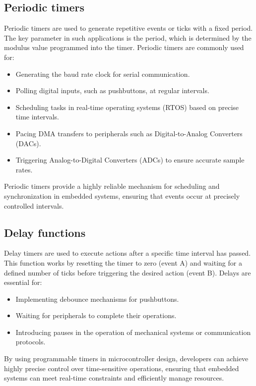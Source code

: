\subsection{Periodic timers}
Periodic timers are used to generate repetitive events or ticks with a fixed period. 
The key parameter in such applications is the period, which is determined by the modulus value programmed into the timer. 
Periodic timers are commonly used for:
\begin{itemize}
    \item Generating the baud rate clock for serial communication.
    \item Polling digital inputs, such as pushbuttons, at regular intervals.
    \item Scheduling tasks in real-time operating systems (RTOS) based on precise time intervals.
    \item Pacing DMA transfers to peripherals such as Digital-to-Analog Converters (DACs).
    \item Triggering Analog-to-Digital Converters (ADCs) to ensure accurate sample rates.
\end{itemize}
Periodic timers provide a highly reliable mechanism for scheduling and synchronization in embedded systems, ensuring that events occur at precisely controlled intervals.

\subsection{Delay functions}
Delay timers are used to execute actions after a specific time interval has passed. 
This function works by resetting the timer to zero (event A) and waiting for a defined number of ticks before triggering the desired action (event B).
Delays are essential for:
\begin{itemize}
    \item Implementing debounce mechanisms for pushbuttons.
    \item Waiting for peripherals to complete their operations.
    \item Introducing pauses in the operation of mechanical systems or communication protocols.
\end{itemize}
By using programmable timers in microcontroller design, developers can achieve highly precise control over time-sensitive operations, ensuring that embedded systems can meet real-time constraints and efficiently manage resources.

